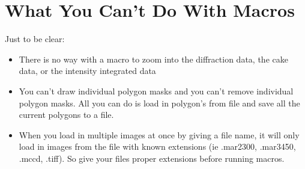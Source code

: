 \section{What You Can't Do With Macros}

Just to be clear:
\begin{itemize}
    \item There is no way with a macro to zoom into the diffraction
    data, the cake data, or the intensity integrated data
    \item You can't draw individual polygon masks and you can't remove
    individual polygon masks. All you can do is load in polygon's from
    file and save all the current polygons to a file.
    \item When you load in multiple images at once by giving a file 
    name, it will only load in images from the file with known 
    extensions (ie .mar2300, .mar3450, .mccd, .tiff). So give your 
    files proper extensions before running macros.
\end{itemize}

